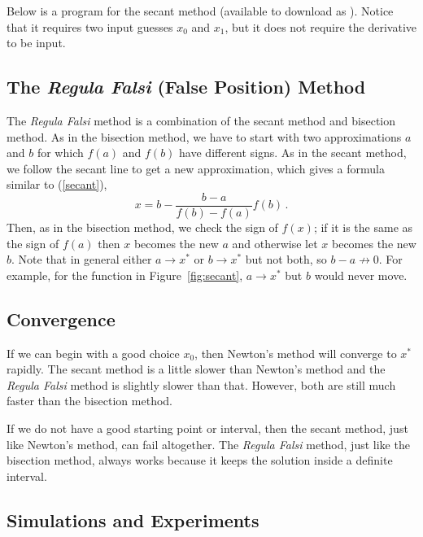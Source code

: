 Below is a program for the secant method (available to download as ). Notice that it requires
two input guesses $x_0$ and $x_1$, but it does not require the derivative
to be input.




\subsection*{The {\em Regula Falsi} (False Position) Method}

The {\em Regula Falsi} method is a combination of the secant
method and bisection method.  As in the bisection method, we have to
start with two approximations $a$ and $b$ for which $f(a)$ and $f(b)$
have different signs. As in the secant method, we follow the secant
line to get a new approximation, which gives a formula similar to
(\ref{secant}),
\begin{equation*}
  x = b - \frac{b - a}{f(b) - f(a)} f(b)
  \,.
\end{equation*}
Then, as in the bisection method, we check the sign of $f(x)$; if it
is the same as the sign of $f(a)$ then $x$ becomes the new $a$ and
otherwise let $x$ becomes the new $b$.  Note that in general either
$a\rightarrow x^*$ or $b\rightarrow x^*$ but not both, so $b-a
\not\rightarrow 0$. For example, for the function in
Figure~\ref{fig:secant}, $a\rightarrow x^*$ but $b$ would never move.



\subsection*{Convergence}

If we can begin with a good choice $x_0$, then Newton's
method will converge to $x^*$ rapidly. The secant method
is a little slower than Newton's method and the {\em Regula
Falsi} method is slightly slower than that. However, both
are still much faster than the bisection method.

If we do not have a good starting point or interval, then
the secant method, just like Newton's method, can fail altogether.
The {\em Regula Falsi} method, just like the bisection method,
always works because it keeps the solution inside a definite
interval.



\subsection*{Simulations and Experiments}

